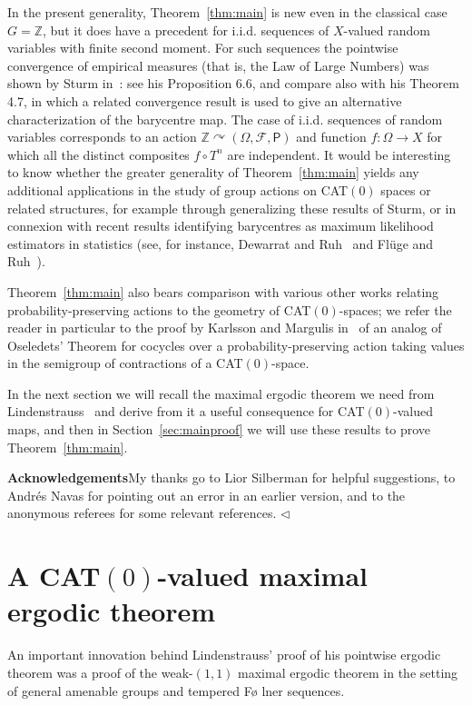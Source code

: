 \documentclass{amsart}
\theoremstyle{remark}
\newcommand{\cal}[1]{\mathcal{#1}}
\newcommand{\bbZ}{\mathbb{Z}}
\newcommand{\sfP}{\mathsf{P}}
\renewcommand{\O}{\Omega}
\newcommand{\fin}{\nolinebreak\hspace{\stretch{1}}$\lhd$}
\begin{document}
In the present generality, Theorem~\ref{thm:main} is new even in the classical case $G
= \bbZ$, but it does have a precedent for i.i.d. sequences of $X$-valued random variables with finite second moment.  For such sequences the pointwise convergence of empirical measures (that is, the Law of Large Numbers) was shown by Sturm in~\cite{Stu03}: see his Proposition 6.6, and compare also with his Theorem 4.7, in which a related convergence result is used to give an alternative characterization of the barycentre map.  The case of i.i.d. sequences of random variables corresponds to an action $\bbZ\curvearrowright (\O,\cal{F},\sfP)$ and function $f:\O\to X$ for which all the distinct composites $f\circ T^n$ are independent.  It would be interesting to know whether the greater generality of Theorem~\ref{thm:main} yields any additional applications in the study of group actions on CAT$(0)$ spaces or related structures, for example through generalizing these results of Sturm, or in connexion with recent results identifying barycentres as maximum likelihood estimators in statistics (see, for instance, Dewarrat and Ruh~\cite{DewRuh02} and Fl\"uge and Ruh~\cite{FluRuh06}).

Theorem~\ref{thm:main} also bears comparison with various other works
relating probability-preserving actions to the geometry of
CAT$(0)$-spaces; we refer the reader in particular to the proof by
Karlsson and Margulis in~\cite{KarMar99} of an analog of Oseledets'
Theorem for cocycles over a probability-preserving action taking
values in the semigroup of contractions of a CAT$(0)$-space.

In the next section we will recall the maximal ergodic theorem we
need from Lindenstrauss~\cite{Lin01} and derive from it a useful
consequence for CAT$(0)$-valued maps, and then in
Section~\ref{sec:mainproof} we will use these results to prove
Theorem~\ref{thm:main}.

\textbf{Acknowledgements}\quad My thanks go to Lior Silberman for
helpful suggestions, to Andr\'es Navas for pointing out an error in an earlier version, and to the anonymous referees for some relevant references. \fin

\section{A CAT$(0)$-valued maximal ergodic theorem}\label{sec:max}

An important innovation behind Lindenstrauss' proof of his pointwise
ergodic theorem was a proof of the weak-$(1,1)$ maximal ergodic
theorem in the setting of general amenable groups and tempered F\o
lner sequences.
\end{document}
